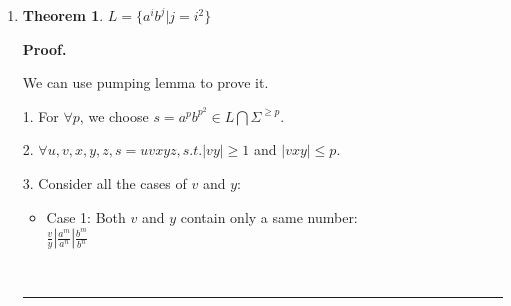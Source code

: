 \documentclass{article}%
\newtheorem{theorem}{Theorem}
\newenvironment{proof}[1][Proof]{\textbf{#1.} }{\ \rule{0.5em}{0.5em}}
\begin{document}
\begin{enumerate}
\begin{enumerate}
\begin{proof}
\begin{itemize}
	\item Case 2: Both $v$ and $y$ contain one number but they are different and $m \geq 1, n \geq 1$: \\
	
	$\frac{v}{y} | \frac{a^m}{b^n}| \frac{b^m}{c^n}$\\
	
	For $v = a , y = b$, we choose $i = 2$. In this way, the number of $b$ would be $p - n$. $p+1+n \geq p + 2$. Thus $s = uv^2xy^2z = a^{p+m}b^{p+1_n}c^{p+2} \notin L$. \\
	
	For $v = b , y = c$, we choose $i = 0$. In this way, the number of $b$ would be $p + 1 - n$. $p+1-m \leq p$. Thus $s = uv^2xy^2z = a^{p}b^{p+1-m}c^{p+2-n} \notin L$. \\
	
	\item Case 3: Either $v$ or $y$ contain two numbers and $m \geq 1, n \geq 1, k \geq 1$: \\
	 
	$\frac{v}{y} | \frac{a^mb^k}{b^n}| \frac{a^m}{a^nb^k}| \frac{b^mc^k}{c^n}| \frac{b^m}{b^nc^k}$\\
	
	When $i = 2$, $s$ will have interleaving patterns, such as $a^mb^ka^mb^k$. Thus $s = uv^2xy^2z \notin L$.
	
	
\end{itemize}
5. 	$ L = \{ 0^i 1^j 2^i 3^j |i,j \ge 1\} $ is non-context-free.
	\end{proof}
	
		\item 
	\begin{theorem}
$ L = \{ a^i b^j |j = i^2 \} $
	\end{theorem}
	\begin{proof}
	
	We can use pumping lemma to prove it.
	
  1. For $\forall p$, we choose $s = a^p b^{p^2}  \in L \bigcap \Sigma ^{\geq p}$. 
  
  2. $\forall u,v,x,y,z, s = uvxyz, s.t. |vy| \geq 1$ and $|vxy| \leq p$.
  
  3. Consider all the cases of $v$ and $y$:
  
\begin{itemize}
	\item Case 1: Both $v$ and $y$ contain only a same number: \\
	
	$\frac{v}{y} | \frac{a^m}{a^n}| \frac{b^m}{b^n}$\\
	

\end{itemize}
\end{proof}
\end{enumerate}
\end{enumerate}
\end{document}
